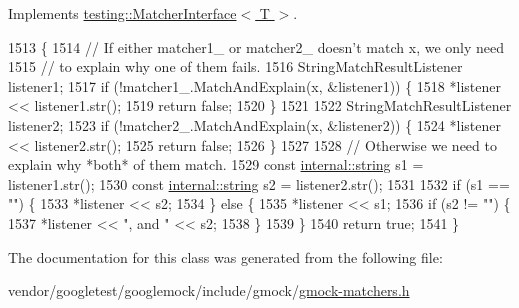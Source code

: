 Implements \hyperlink{classtesting_1_1MatcherInterface_a296b43607cd99d60365f0e6a762777cf}{testing\+::\+Matcher\+Interface$<$ T $>$}.


\begin{DoxyCode}
1513                                                                          \{
1514     \textcolor{comment}{// If either matcher1\_ or matcher2\_ doesn't match x, we only need}
1515     \textcolor{comment}{// to explain why one of them fails.}
1516     StringMatchResultListener listener1;
1517     \textcolor{keywordflow}{if} (!matcher1\_.MatchAndExplain(x, &listener1)) \{
1518       *listener << listener1.str();
1519       \textcolor{keywordflow}{return} \textcolor{keyword}{false};
1520     \}
1521 
1522     StringMatchResultListener listener2;
1523     \textcolor{keywordflow}{if} (!matcher2\_.MatchAndExplain(x, &listener2)) \{
1524       *listener << listener2.str();
1525       \textcolor{keywordflow}{return} \textcolor{keyword}{false};
1526     \}
1527 
1528     \textcolor{comment}{// Otherwise we need to explain why *both* of them match.}
1529     \textcolor{keyword}{const} \hyperlink{namespacetesting_1_1internal_a8e8ff5b11e64078831112677156cb111}{internal::string} s1 = listener1.str();
1530     \textcolor{keyword}{const} \hyperlink{namespacetesting_1_1internal_a8e8ff5b11e64078831112677156cb111}{internal::string} s2 = listener2.str();
1531 
1532     \textcolor{keywordflow}{if} (s1 == \textcolor{stringliteral}{""}) \{
1533       *listener << s2;
1534     \} \textcolor{keywordflow}{else} \{
1535       *listener << s1;
1536       \textcolor{keywordflow}{if} (s2 != \textcolor{stringliteral}{""}) \{
1537         *listener << \textcolor{stringliteral}{", and "} << s2;
1538       \}
1539     \}
1540     \textcolor{keywordflow}{return} \textcolor{keyword}{true};
1541   \}
\end{DoxyCode}


The documentation for this class was generated from the following file\+:\begin{DoxyCompactItemize}
\item 
vendor/googletest/googlemock/include/gmock/\hyperlink{gmock-matchers_8h}{gmock-\/matchers.\+h}\end{DoxyCompactItemize}

